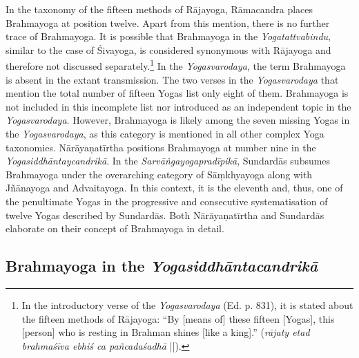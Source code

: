 In the taxonomy of the fifteen methods of Rājayoga, Rāmacandra places Brahmayoga at position twelve. Apart from this mention, there is no further trace of Brahmayoga. It is possible that Brahmayoga in the \emph{Yogatattvabindu}, similar to the case of Śivayoga, is considered synonymous with Rājayoga and therefore not discussed separately.\footnote{In the introductory verse of the \emph{Yogasvarodaya} (Ed. p. 831), it is stated about the fifteen methods of Rājayoga: ``By [means of] these fifteen [Yogas], this [person] who is resting in Brahman shines [like a king].'' (\textit{rājaty etad brahmaśīva ebhiś ca pañcadaśadhā} ||).} In the \textit{Yogasvarodaya}, the term Brahmayoga is absent in the extant transmission. The two verses in the \textit{Yogasvarodaya} that mention the total number of fifteen Yogas list only eight of them. Brahmayoga is not included in this incomplete list nor introduced as an independent topic in the \textit{Yogasvarodaya}. However, Brahmayoga is likely among the seven missing Yogas in the \textit{Yogasvarodaya}, as this category is mentioned in all other complex Yoga taxonomies. Nārāyaṇatīrtha positions Brahmayoga at number nine in the \textit{Yogasiddhāntaycandrikā}. In the \textit{Sarvāṅgayogapradīpikā}, Sundardās subsumes Brahmayoga under the overarching category of Sāṃkhyayoga along with Jñānayoga and Advaitayoga. In this context, it is the eleventh and, thus, one of the penultimate Yogas in the progressive and consecutive systematisation of twelve Yogas described by Sundardās. Both Nārāyaṇatīrtha and Sundardās elaborate on their concept of Brahmayoga in detail. 

\subsection{Brahmayoga in the \textit{Yogasiddhāntacandrikā}}

